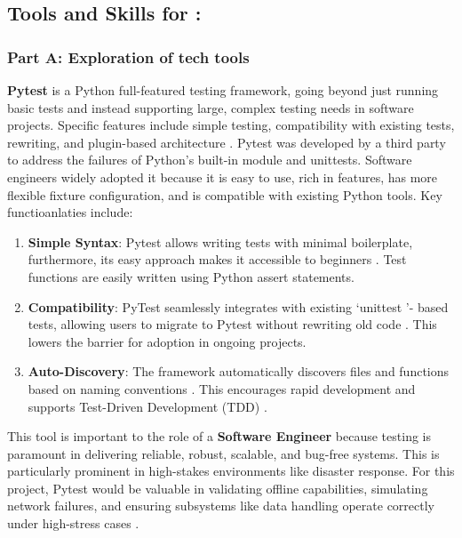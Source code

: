 \documentclass[a4paper, 11pt]{report}
\begin{document}

\subsection{Tools and Skills for \majC: \studC}

\subsubsection{Part A: Exploration of tech tools}

\textbf{Pytest} is a Python full-featured testing framework, going beyond just running basic tests and instead supporting large, complex testing needs in software projects. Specific features include simple testing, compatibility with existing tests, rewriting, and plugin-based architecture \cite{schmitt2024}. Pytest was developed by a third party to address the failures of Python's built-in module and unittests. Software engineers widely adopted it because it is easy to use, rich in features, has more flexible fixture configuration, and is compatible with existing Python tools. Key functioanlaties include:

\begin{enumerate}
    \item \textbf{Simple Syntax}: Pytest allows writing tests with minimal boilerplate, furthermore, its easy approach makes it accessible to beginners \cite{schmitt2024}. Test functions are easily written using Python assert statements. 
    \item \textbf{Compatibility}: PyTest seamlessly integrates with existing `unittest '- based tests, allowing users to migrate to Pytest without rewriting old code \cite{schmitt2024}. This lowers the barrier for adoption in ongoing projects.
    \item \textbf{Auto-Discovery}: The framework automatically discovers files and functions based on naming conventions \cite{hawk2023}. This encourages rapid development and supports Test-Driven Development (TDD) \cite{hawk2023}.
\end{enumerate}

This tool is important to the role of a \textbf{Software Engineer} because testing is paramount in delivering reliable, robust, scalable, and bug-free systems. This is particularly prominent in high-stakes environments like disaster response. For this project, Pytest would be valuable in validating offline capabilities, simulating network failures, and ensuring subsystems like data handling operate correctly under high-stress cases \cite{sharma2024}. 
\end{document}
